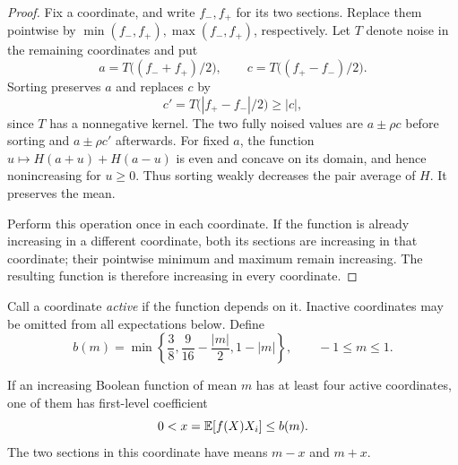 \begin{proof}
Fix a coordinate, and write $f_-,f_+$ for its two sections.  Replace them
pointwise by $\min(f_-,f_+),\max(f_-,f_+)$, respectively.  Let $T$ denote
noise in the remaining coordinates and put
\[
 a=T\bigl((f_-+f_+)/2\bigr),\qquad
 c=T\bigl((f_+-f_-)/2\bigr).
\]
Sorting preserves $a$ and replaces $c$ by
\[
 c'=T\bigl(|f_+-f_-|/2\bigr)\ge |c|,
\]
since $T$ has a nonnegative kernel.  The two fully noised values are
$a\pm\rho c$ before sorting and $a\pm\rho c'$ afterwards.  For fixed $a$,
the function $u\mapsto H(a+u)+H(a-u)$ is even and concave on its domain,
and hence nonincreasing for $u\ge0$.  Thus sorting weakly decreases the
pair average of $H$.  It preserves the mean.

Perform this operation once in each coordinate.  If the function is
already increasing in a different coordinate, both its sections are
increasing in that coordinate; their pointwise minimum and maximum remain
increasing. The resulting function is therefore increasing in every
coordinate.
\end{proof}

Call a coordinate \emph{active} if the function depends on it.  Inactive
coordinates may be omitted from all expectations below.  Define
\begin{equation}\label{ind:eq:b}
 b(m)=\min\left\{\frac38,\frac9{16}-\frac{|m|}{2},1-|m|\right\},
 \qquad -1\le m\le1.
\end{equation}

\begin{lemma}\label{ind:lem:coordinate}
If an increasing Boolean function of mean $m$ has at least four active
coordinates, one of them has first-level coefficient
\[
 0<x=\mathbb E[f(X)X_i]\le b(m).
\]
The two sections in this coordinate have means $m-x$ and $m+x$.
\end{lemma}

